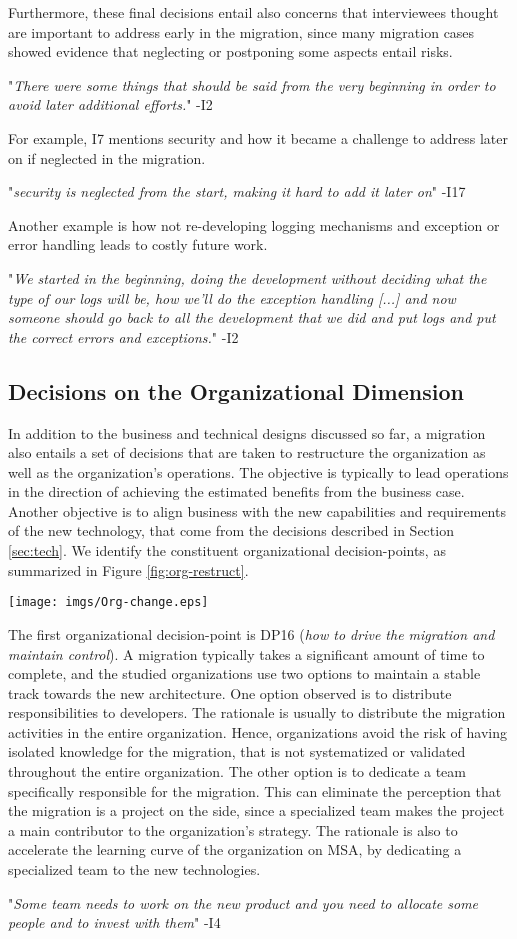 \documentclass[sigconf,dvipsnames]{acmart}
\newcommand{\interviewquote}[2]{
 \def\FrameCommand{%
    \hspace{0pt}%
    {\color{MidnightBlue}\vrule width 1.5pt}%
    {\color{white}\vrule width 4pt}%
    \colorbox{white}
  }%
  \MakeFramed{\advance\hsize-\width\FrameRestore}%
  \noindent\hspace{-4.55pt}%
  \footnotesize{"\emph{#1}" -{#2}}\vspace{0.5pt}\endMakeFramed%
}
\begin{document}
Furthermore, these final decisions entail also concerns that interviewees thought are important to address early in the migration, since many migration cases showed evidence that neglecting or postponing some aspects entail risks.
\interviewquote{There were some things that should be said from the very beginning in order to avoid later additional efforts.}{I2}
For example, I7 mentions security and how it became a challenge to address later on if neglected in the migration.
\interviewquote{security is neglected from the start, making it hard to add it later on}{I17}
Another example is how not re-developing logging mechanisms and exception or error handling leads to costly future work.
\interviewquote{We started in the beginning, doing the development without deciding what the type of our logs will be, how we’ll do the exception handling [...] and now someone should go back to all the development that we did and put logs and put the correct errors and exceptions.}{I2}


\subsection{Decisions on the Organizational Dimension}
In addition to the business and technical designs discussed so far, a migration also entails a set of decisions that are taken to restructure the organization as well as the organization's operations.
The objective is typically to lead operations in the direction of achieving the estimated benefits from the business case.
Another objective is to align business with the new capabilities and requirements of the new technology, that come from the decisions described in Section \ref{sec:tech}.
We identify the constituent organizational decision-points, as summarized in Figure \ref{fig:org-restruct}. 

\begin{figure*}[h!]
  \centering
  \texttt{[image: imgs/Org-change.eps]}
  \caption{Restructuring the organizational structures and operations}
  \label{fig:org-restruct}
\end{figure*}

The first organizational decision-point is DP16 (\emph{how to drive the migration and maintain control}).
A migration typically takes a significant amount of time to complete, and the studied organizations use two options to maintain a stable track towards the new architecture. 
One option observed is to distribute responsibilities to developers.
The rationale is usually to distribute the migration activities in the entire organization. Hence, organizations avoid the risk of having isolated knowledge for the migration, that is not systematized or validated throughout the entire organization.
The other option is to dedicate a team specifically responsible for the migration. This can eliminate the perception that the migration is a project on the side, since a specialized team makes the project a main contributor to the organization's strategy. 
The rationale is also to accelerate the learning curve of the organization on MSA, by dedicating a specialized team to the new technologies.
    \interviewquote{Some team needs to work on the new product and you need to allocate some people and to invest with them}{I4}
    
\end{document}
